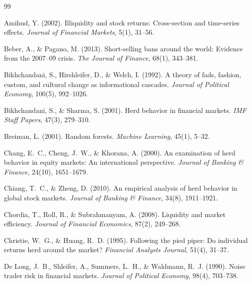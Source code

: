 \documentclass[12pt, a4paper]{article}
\begin{document}
\begin{thebibliography}{99}

Amihud, Y. (2002).
\newblock Illiquidity and stock returns: Cross-section and time-series effects.
\newblock \textit{Journal of Financial Markets}, 5(1), 31--56.

Beber, A., \& Pagano, M. (2013).
\newblock Short-selling bans around the world: Evidence from the 2007--09 crisis.
\newblock \textit{The Journal of Finance}, 68(1), 343--381.

Bikhchandani, S., Hirshleifer, D., \& Welch, I. (1992).
\newblock A theory of fads, fashion, custom, and cultural change as informational cascades.
\newblock \textit{Journal of Political Economy}, 100(5), 992--1026.

Bikhchandani, S., \& Sharma, S. (2001).
\newblock Herd behavior in financial markets.
\newblock \textit{IMF Staff Papers}, 47(3), 279--310.

Breiman, L. (2001).
\newblock Random forests.
\newblock \textit{Machine Learning}, 45(1), 5--32.

Chang, E.~C., Cheng, J.~W., \& Khorana, A. (2000).
\newblock An examination of herd behavior in equity markets: An international perspective.
\newblock \textit{Journal of Banking \& Finance}, 24(10), 1651--1679.

Chiang, T.~C., \& Zheng, D. (2010).
\newblock An empirical analysis of herd behavior in global stock markets.
\newblock \textit{Journal of Banking \& Finance}, 34(8), 1911--1921.

Chordia, T., Roll, R., \& Subrahmanyam, A. (2008).
\newblock Liquidity and market efficiency.
\newblock \textit{Journal of Financial Economics}, 87(2), 249--268.

Christie, W.~G., \& Huang, R.~D. (1995).
\newblock Following the pied piper: Do individual returns herd around the market?
\newblock \textit{Financial Analysts Journal}, 51(4), 31--37.

De Long, J.~B., Shleifer, A., Summers, L.~H., \& Waldmann, R.~J. (1990).
\newblock Noise trader risk in financial markets.
\newblock \textit{Journal of Political Economy}, 98(4), 703--738.


\end{thebibliography}
\end{document}
